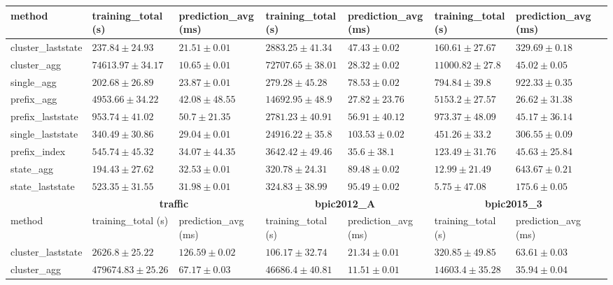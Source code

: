 \documentclass[twoside,11pt]{Latex/Classes/PhDthesisPSnPDF}
\begin{document}
\begin{table}[h]
{\begin{tabular}{llllllll}
			method  & training\_total (s) & prediction\_avg (ms) & training\_total (s) & prediction\_avg (ms) & training\_total (s) & prediction\_avg (ms) \\ \midrule
			cluster\_laststate & $237.84 \pm 24.93$ & $21.51 \pm 0.01$ & $2883.25 \pm 41.34$ & $47.43 \pm 0.02$ & $160.61 \pm 27.67$ & $329.69 \pm 0.18$ \\ 
			cluster\_agg & $74613.97 \pm 34.17$ & $\mathbf{10.65 \pm 0.01}$ & $72707.65 \pm 38.01$ & $28.32 \pm 0.02$ & $11000.82 \pm 27.8$ & $45.02 \pm 0.05$ \\ 
			single\_agg & $202.68 \pm 26.89$ & $23.87 \pm 0.01$ & $279.28 \pm 45.28$ & $78.53 \pm 0.02$ & $794.84 \pm 39.8$ & $922.33 \pm 0.35$ \\ 
			prefix\_agg & $4953.66 \pm 34.22$ & $42.08 \pm 48.55$ & $14692.95 \pm 48.9$ & $\mathbf{27.82 \pm 23.76}$ & $5153.2 \pm 27.57$ & $\mathbf{26.62 \pm 31.38}$ \\ 
			prefix\_laststate & $953.74 \pm 41.02$ & $50.7 \pm 21.35$ & $2781.23 \pm 40.91$ & $56.91 \pm 40.12$ & $973.37 \pm 48.09$ & $45.17 \pm 36.14$ \\ 
			single\_laststate & $340.49 \pm 30.86$ & $29.04 \pm 0.01$ & $24916.22 \pm 35.8$ & $103.53 \pm 0.02$ & $451.26 \pm 33.2$ & $306.55 \pm 0.09$ \\ 
			prefix\_index & $545.74 \pm 45.32$ & $34.07 \pm 44.35$ & $3642.42 \pm 49.46$ & $35.6 \pm 38.1$ & $123.49 \pm 31.76$ & $45.63 \pm 25.84$ \\ 
			state\_agg & $\mathbf{194.43 \pm 27.62}$ & $32.53 \pm 0.01$ & $\mathbf{320.78 \pm 24.31}$ & $89.48 \pm 0.02$ & $12.99 \pm 21.49$ & $643.67 \pm 0.21$ \\ 
			state\_laststate & $523.35 \pm 31.55$ & $31.98 \pm 0.01$ & $324.83 \pm 38.99$ & $95.49 \pm 0.02$ & $\mathbf{5.75 \pm 47.08}$ & $175.6 \pm 0.05$ \\ 
			\bottomrule
			\toprule
			& \multicolumn{2}{c}{{\bfseries traffic}} & \multicolumn{2}{c}{{\bfseries bpic2012\_A}} & \multicolumn{2}{c}{{\bfseries bpic2015\_3}} \\ \cmidrule(lr){2-3} \cmidrule(lr){4-5} \cmidrule(lr){6-7}
			method  & training\_total (s) & prediction\_avg (ms) & training\_total (s) & prediction\_avg (ms) & training\_total (s) & prediction\_avg (ms) \\ \midrule
			cluster\_laststate & $2626.8 \pm 25.22$ & $126.59 \pm 0.02$ & $106.17 \pm 32.74$ & $21.34 \pm 0.01$ & $320.85 \pm 49.85$ & $63.61 \pm 0.03$ \\ 
			cluster\_agg & $479674.83 \pm 25.26$ & $67.17 \pm 0.03$ & $46686.4 \pm 40.81$ & $\mathbf{11.51 \pm 0.01}$ & $14603.4 \pm 35.28$ & $35.94 \pm 0.04$ \\ 

\end{tabular}}
\end{table}
\end{document}
